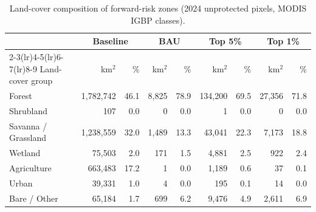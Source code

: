 \begin{table}[htbp]
  \centering
  \small
  \caption{Land-cover composition of forward-risk zones (2024 unprotected pixels, MODIS IGBP classes).}
  \label{tab:landcover_exposure}
  \begin{tabular}{lrrrrrrrr}
    \toprule
    & \multicolumn{2}{c}{Baseline} & \multicolumn{2}{c}{BAU} & \multicolumn{2}{c}{Top 5\%} & \multicolumn{2}{c}{Top 1\%} \\
    \cmidrule(lr){2-3}\cmidrule(lr){4-5}\cmidrule(lr){6-7}\cmidrule(lr){8-9}
    Land-cover group & km$^2$ & \% & km$^2$ & \% & km$^2$ & \% & km$^2$ & \% \\
    \midrule
    Forest & 1,782,742 & 46.1 & 8,825 & 78.9 & 134,200 & 69.5 & 27,356 & 71.8 \\
    Shrubland & 107 & 0.0 & 0 & 0.0 & 1 & 0.0 & 0 & 0.0 \\
    Savanna / Grassland & 1,238,559 & 32.0 & 1,489 & 13.3 & 43,041 & 22.3 & 7,173 & 18.8 \\
    Wetland & 75,503 & 2.0 & 171 & 1.5 & 4,881 & 2.5 & 922 & 2.4 \\
    Agriculture & 663,483 & 17.2 & 1 & 0.0 & 1,189 & 0.6 & 37 & 0.1 \\
    Urban & 39,331 & 1.0 & 4 & 0.0 & 195 & 0.1 & 14 & 0.0 \\
    Bare / Other & 65,184 & 1.7 & 699 & 6.2 & 9,476 & 4.9 & 2,611 & 6.9 \\
    \bottomrule
  \end{tabular}
\end{table}
